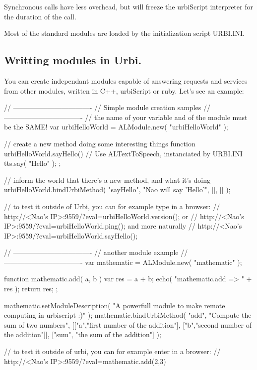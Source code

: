 Synchronous calls have less overhead, but will freeze the urbiScript
interpreter for the duration of the call.

Most of the standard modules are loaded by the initialization script URBI.INI.

\subsection{Writting \naoqi modules in Urbi.}

You can create independant modules capable of answering requests and services
from other \naoqi modules, written in C++, urbiScript or ruby. Let's see an
example:

\begin{urbiunchecked}

// ----------------------------------
// Simple module creation samples
// ----------------------------------
// the name of your variable and of the module must be the SAME!
var urbiHelloWorld = ALModule.new( "urbiHelloWorld" );

// create a new method doing some interesting things
function urbiHelloWorld.sayHello()
{
  // Use ALTextToSpeech, instanciated by URBI.INI
  tts.say( "Hello" );
};

// inform the world that there's a new method, and what it's doing
urbiHelloWorld.bindUrbiMethod( "sayHello", "Nao will say 'Hello'", [], [] );

// to test it outside of Urbi, you can for example type in a browser:
// http://<Nao's IP>:9559/?eval=urbiHelloWorld.version(); or
// http://<Nao's IP>:9559/?eval=urbiHelloWorld.ping(); and more naturally
// http://<Nao's IP>:9559/?eval=urbiHelloWorld.sayHello();

// ----------------------------------
// another module example
// ----------------------------------
var mathematic = ALModule.new( "mathematic" );

function mathematic.add( a, b )
{
  var res = a + b;
  echo( "mathematic.add => " + res );
  return res;
};

mathematic.setModuleDescription(
  "A powerfull module to make remote computing in urbiscript :)" );
mathematic.bindUrbiMethod( "add", "Compute the sum of two numbers",
[["a","first number of the addition"],
["b","second number of the addition"]],
["sum", "the sum of the addition"] );

// to test it outside of urbi, you can for example enter in a browser:
// http://<Nao's IP>:9559/?eval=mathematic.add(2,3)
\end{urbiunchecked}


